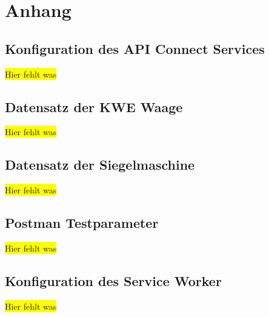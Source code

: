 \chapter{Anhang}
\label{ch:anhang}

\section{Konfiguration des API Connect Services}
\label{sec:konfigurationAPIConnect}
\colorbox{yellow}{Hier fehlt was}

\section{Datensatz der KWE Waage}
\label{sec:scaleData}
\colorbox{yellow}{Hier fehlt was}

\section{Datensatz der Siegelmaschine}
\label{sec:hariboSiegel}
\colorbox{yellow}{Hier fehlt was}

\section{Postman Testparameter}
\label{sec:postmanTestparameter}
\colorbox{yellow}{Hier fehlt was}

\section{Konfiguration des Service Worker}
\label{sec:serviceWorkerConfig}
\colorbox{yellow}{Hier fehlt was}